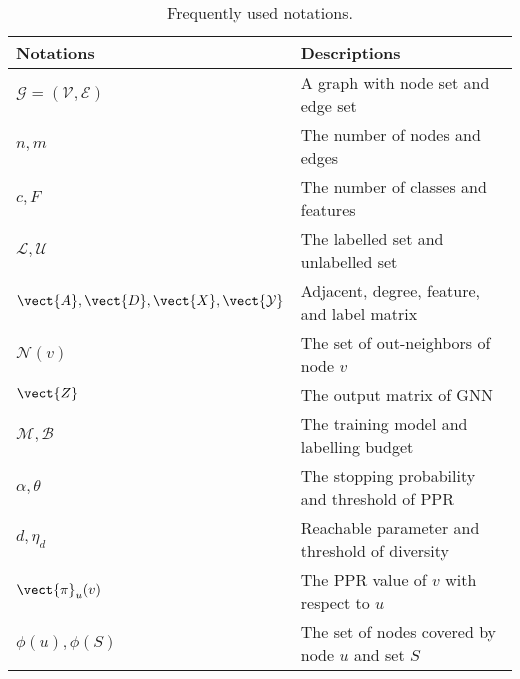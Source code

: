 \begin{table}[t]
  \caption{Frequently used notations.}
  \vspace{-4mm}
  \label{tab:table-notations}
  \begin{tabular}{|l|l|}
    \hline
    Notations & Descriptions\\
    \hline
    $\mathcal{G}=(\mathcal{V},\mathcal{E})$ & A graph with node set and edge set\\
    \hline
    $n,m$ & The number of nodes and edges\\
    \hline
    $c,F$ & The number of classes and features\\
    \hline
    $\mathcal{L},\mathcal{U}$ & The labelled set and unlabelled set\\
    \hline
    $\vect{A},\vect{D},\vect{X},\vect{\mathcal{Y}}$ & Adjacent, degree, feature, and label matrix\\
    \hline
    $\mathcal{N}(v)$ & The set of out-neighbors of node $v$\\
    \hline
    $\vect{Z}$ & The output matrix of GNN\\
    \hline
    $\mathcal{M},\mathcal{B}$ & The training model and labelling budget\\
    \hline
    $\alpha, \theta$ & The stopping probability and threshold of PPR\\
    \hline
    $d,\eta_d$ & Reachable parameter and threshold of diversity\\
    \hline
    $\vect{\pi}_u(v)$ & The PPR value of $v$ with respect to $u$\\
    \hline
    $\phi(u), \phi(S)$ & The set of nodes covered by node $u$ and set $S$\\
    \hline
\end{tabular}
\end{table}